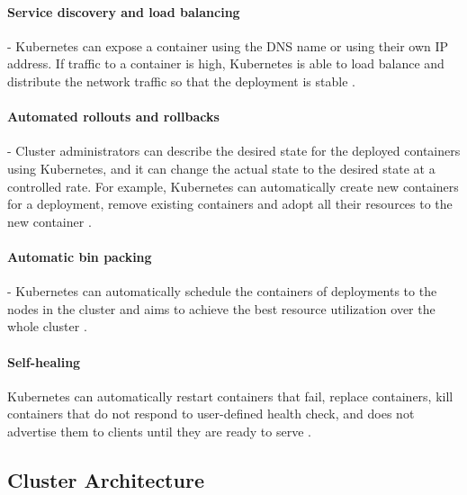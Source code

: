 \paragraph{Service discovery and load balancing} - Kubernetes can expose a container using the DNS name or using their own IP address. If traffic to a container is high, Kubernetes is able to load balance and distribute the network traffic so that the deployment is stable \cite{KubernetesOverview}.

\paragraph{Automated rollouts and rollbacks} - Cluster administrators can describe the desired state for the deployed containers using Kubernetes, and it can change the actual state to the desired state at a controlled rate. For example, Kubernetes can automatically create new containers for a deployment, remove existing containers and adopt all their resources to the new container \cite{KubernetesOverview}.

\paragraph{Automatic bin packing} - Kubernetes can automatically schedule the containers of deployments to the nodes in the cluster and aims to achieve the best resource utilization over the whole cluster \cite{KubernetesOverview}.

\paragraph{Self-healing} Kubernetes can automatically restart containers that fail, replace containers, kill containers that do not respond to user-defined health check, and does not advertise them to clients until they are ready to serve \cite{KubernetesOverview}.

\subsection{Cluster Architecture}

